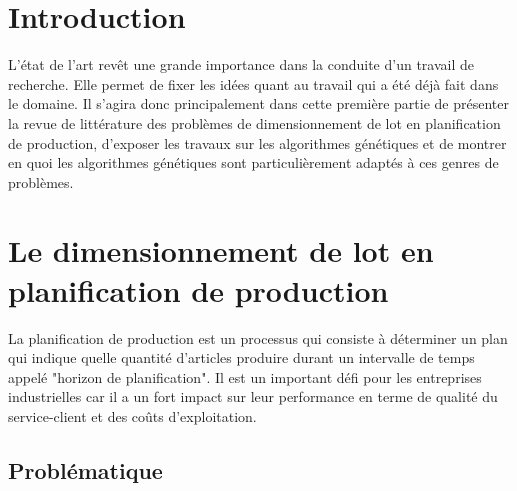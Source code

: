 \documentclass[12pt,a4paper]{article}
\begin{document}
	\section*{Introduction}
		
		L'état de l'art revêt une grande importance dans la conduite d'un travail de recherche. Elle permet de fixer les idées quant au travail qui a été déjà fait dans le domaine. Il s'agira donc principalement dans cette première partie de présenter la revue de littérature des problèmes de dimensionnement de lot en planification de production, d'exposer les travaux sur les algorithmes génétiques et de montrer en quoi les algorithmes génétiques sont particulièrement adaptés à ces genres de problèmes.
		
	\section{Le dimensionnement de lot en planification de production}
	La planification de production est un processus qui consiste à déterminer un plan qui indique quelle quantité d'articles produire durant un intervalle de temps appelé "horizon de planification". Il est un important défi pour les entreprises industrielles car il a un fort impact sur leur performance en terme de qualité du service-client et des coûts d'exploitation.	
	
	\subsection{Problématique}
		
\end{document}
